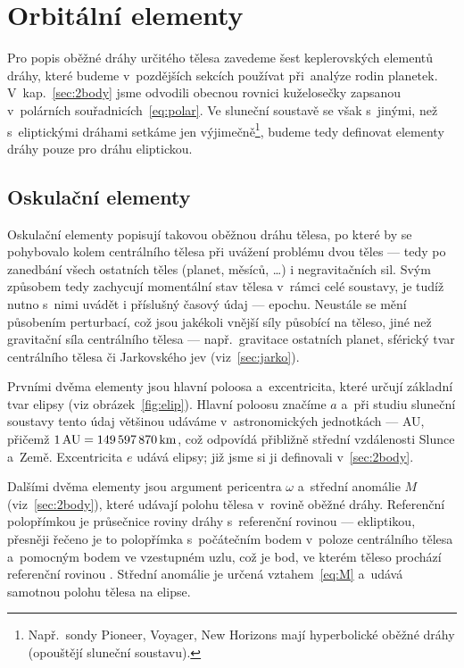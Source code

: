 \documentclass[A4paper, 12pt, oneside]{book}
\begin{document}
\pagebreak
\section{Orbitální elementy} \label{sec:orbelem}
Pro popis oběžné dráhy určitého tělesa zavedeme šest keplerovských elementů dráhy, které budeme v~pozdějších sekcích používat při~analýze rodin planetek. V~kap.~\ref{sec:2body} jsme odvodili obecnou rovnici kuželosečky zapsanou v~polárních souřadnicích~\eqref{eq:polar}. Ve sluneční soustavě se však s~jinými, než s~eliptickými dráhami setkáme jen výjimečně\footnote{Např.\ sondy Pioneer, Voyager, New Horizons mají hyperbolické oběžné dráhy (opouštějí sluneční soustavu).}, budeme tedy definovat elementy dráhy pouze pro dráhu eliptickou.
\subsection{Oskulační elementy}
Oskulační elementy popisují takovou oběžnou dráhu tělesa, po které by se pohybovalo kolem centrálního tělesa při uvážení problému dvou těles --- tedy po zanedbání všech ostatních těles (planet, měsíců, \ldots) i negravitačních sil. Svým způsobem tedy zachycují momentální stav tělesa v~rámci celé soustavy, je tudíž nutno s~nimi uvádět i příslušný časový údaj --- epochu. Neustále se mění působením perturbací, což jsou jakékoli vnější síly působící na těleso, jiné než gravitační síla centrálního tělesa --- např.\ gravitace ostatních planet, sférický tvar centrálního tělesa či Jarkovského jev (viz~\ref{sec:jarko}).

Prvními dvěma elementy jsou hlavní poloosa a~excentricita, které určují základní tvar elipsy (viz obrázek~\ref{fig:elip}). Hlavní poloosu značíme $a$ a~při studiu sluneční soustavy tento údaj většinou udáváme v~astronomických jednotkách --- AU, přičemž $1\, {\rm AU} = 149\,597\,870\,{\rm km}$, což odpovídá přibližně střední vzdálenosti Slunce a~Země. Excentricita $e$ udává  elipsy; již jsme si ji definovali v~\ref{sec:2body}.

Dalšími dvěma elementy jsou argument pericentra $\omega$ a~střední anomálie $M$ (viz~\ref{sec:2body}), které udávají polohu tělesa v~rovině oběžné dráhy. Referenční polopřímkou je průsečnice roviny dráhy s~referenční rovinou --- ekliptikou, přesněji řečeno je to polopřímka s~počátečním bodem v~poloze centrálního tělesa a~pomocným bodem ve vzestupném uzlu, což je bod, ve kterém těleso prochází referenční rovinou . Střední anomálie je určená vztahem~\eqref{eq:M} a~udává samotnou polohu tělesa na elipse.
\end{document}
